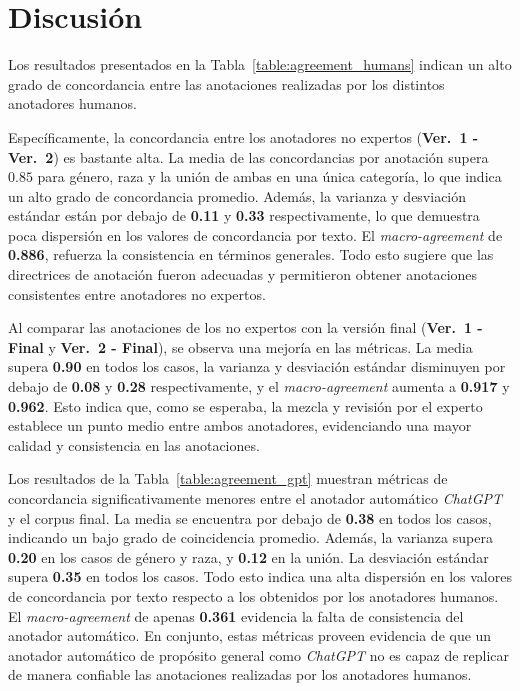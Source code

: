 \section{Discusi\'on}
Los resultados presentados en la Tabla~\ref{table:agreement_humans} indican un alto grado de concordancia entre las 
anotaciones realizadas por los distintos anotadores humanos.

Espec\'ificamente, la concordancia entre los anotadores no expertos (\textbf{Ver.~1 - Ver.~2}) es bastante alta. La
media de las concordancias por anotaci\'on supera \textbf{$0.85$} para g\'enero, raza y la uni\'on de ambas en una \'unica categor\'ia,
lo que indica un alto grado de concordancia promedio. Adem\'as, la varianza y desviaci\'on est\'andar est\'an por debajo de 
\textbf{0.11} y \textbf{0.33} respectivamente, lo que demuestra poca dispersi\'on en los valores de concordancia por texto. El
\emph{macro-agreement} de \textbf{0.886}, refuerza la consistencia en t\'erminos generales. Todo esto sugiere que las directrices 
de anotaci\'on fueron adecuadas y permitieron obtener anotaciones consistentes entre anotadores no expertos.

Al comparar las anotaciones de los no expertos con la versi\'on final (\textbf{Ver.~1 - Final} y \textbf{Ver.~2 - Final}), se
observa una mejor\'ia en las m\'etricas. La media supera \textbf{0.90} en todos los casos, la varianza y desviaci\'on est\'andar
disminuyen por debajo de \textbf{0.08} y \textbf{0.28} respectivamente, y el \emph{macro-agreement} aumenta a \textbf{0.917} y 
\textbf{0.962}. Esto indica que, como se esperaba, la mezcla y revisi\'on por el experto establece un 
punto medio entre ambos anotadores, evidenciando una mayor calidad y consistencia en las anotaciones.

Los resultados de la Tabla~\ref{table:agreement_gpt} muestran m\'etricas de concordancia significativamente menores entre 
el anotador autom\'atico \emph{ChatGPT} y el corpus final. La media se encuentra por debajo de \textbf{0.38} en todos los casos,
indicando un bajo grado de coincidencia promedio. Adem\'as, la varianza supera \textbf{0.20} en los casos de g\'enero y raza, y 
\textbf{0.12} en la uni\'on. La desviaci\'on est\'andar supera \textbf{0.35} en todos los casos. Todo esto indica una alta 
dispersi\'on en los valores de concordancia por texto respecto a los obtenidos por los anotadores humanos. El 
\emph{macro-agreement} de apenas \textbf{0.361} evidencia la falta de consistencia del anotador autom\'atico. En conjunto, estas
m\'etricas proveen evidencia de que un anotador autom\'atico de prop\'osito general como \emph{ChatGPT} no es capaz de replicar
de manera confiable las anotaciones realizadas por los anotadores humanos.  

